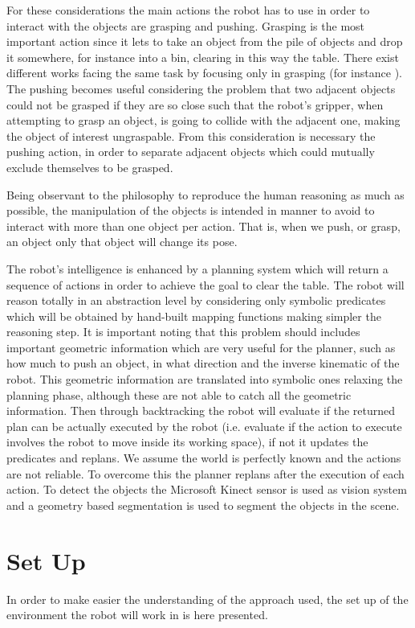 For these considerations the main actions the robot has to use in order to interact with the objects are grasping and pushing.
Grasping is the most important action since it lets to take an object from the pile of objects and drop it somewhere, for instance into a bin, clearing in this way the table. There exist different works facing the same task by focusing only in grasping (for instance \citep{AGILE}). The pushing becomes useful considering the problem that two adjacent objects could not be grasped if they are so close such that the robot's gripper, when attempting to grasp an object, is going to collide with the adjacent one, making the object of interest ungraspable. From this consideration is necessary the pushing action, in order to separate adjacent objects which could mutually exclude themselves to be grasped. 

Being observant to the philosophy to reproduce the human reasoning as much as possible, the manipulation of the objects is intended in manner to avoid to interact with more than one object per action. That is, when we push, or grasp, an object only that object will change its pose. 

The robot's intelligence is enhanced by a planning system  which will return a sequence of actions in order to achieve the goal to clear the table. 
The robot will reason totally in an abstraction level by considering only symbolic predicates which will be obtained by hand-built mapping functions making simpler the reasoning step. It is important noting that this problem should includes important geometric information which are very useful for the planner, such as how much to push an object, in what direction and the inverse kinematic of the robot. This geometric information are translated into symbolic ones relaxing the planning phase, although these are not able to catch all the geometric information. Then through backtracking the robot will evaluate if the returned plan can be actually executed by the robot (i.e. evaluate if the action to execute involves the robot to move inside its working space), if not it updates the predicates and replans. 
We assume the world is perfectly known and the actions are not reliable. To overcome this the planner replans after the execution of each action.  
To detect the objects the Microsoft Kinect sensor is used as vision system and a geometry based segmentation is used to segment the objects in the scene.

\section{Set Up}
In order to make easier the understanding of the approach used, the set up of the environment the robot will work in is here presented. 

